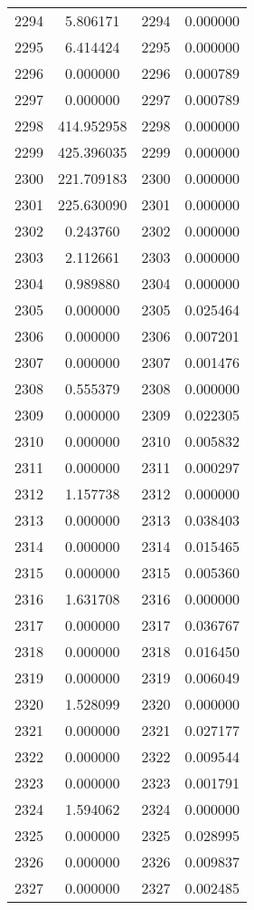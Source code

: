 \documentclass[12pt]{article}
\begin{document}
\begin{longtable}{@{}cccc@{}}
2294 & 5.806171 & 2294 & 0.000000 \\
2295 & 6.414424 & 2295 & 0.000000 \\
2296 & 0.000000 & 2296 & 0.000789 \\
2297 & 0.000000 & 2297 & 0.000789 \\
2298 & 414.952958 & 2298 & 0.000000 \\
2299 & 425.396035 & 2299 & 0.000000 \\
2300 & 221.709183 & 2300 & 0.000000 \\
2301 & 225.630090 & 2301 & 0.000000 \\
2302 & 0.243760 & 2302 & 0.000000 \\
2303 & 2.112661 & 2303 & 0.000000 \\
2304 & 0.989880 & 2304 & 0.000000 \\
2305 & 0.000000 & 2305 & 0.025464 \\
2306 & 0.000000 & 2306 & 0.007201 \\
2307 & 0.000000 & 2307 & 0.001476 \\
2308 & 0.555379 & 2308 & 0.000000 \\
2309 & 0.000000 & 2309 & 0.022305 \\
2310 & 0.000000 & 2310 & 0.005832 \\
2311 & 0.000000 & 2311 & 0.000297 \\
2312 & 1.157738 & 2312 & 0.000000 \\
2313 & 0.000000 & 2313 & 0.038403 \\
2314 & 0.000000 & 2314 & 0.015465 \\
2315 & 0.000000 & 2315 & 0.005360 \\
2316 & 1.631708 & 2316 & 0.000000 \\
2317 & 0.000000 & 2317 & 0.036767 \\
2318 & 0.000000 & 2318 & 0.016450 \\
2319 & 0.000000 & 2319 & 0.006049 \\
2320 & 1.528099 & 2320 & 0.000000 \\
2321 & 0.000000 & 2321 & 0.027177 \\
2322 & 0.000000 & 2322 & 0.009544 \\
2323 & 0.000000 & 2323 & 0.001791 \\
2324 & 1.594062 & 2324 & 0.000000 \\
2325 & 0.000000 & 2325 & 0.028995 \\
2326 & 0.000000 & 2326 & 0.009837 \\
2327 & 0.000000 & 2327 & 0.002485 \\

\end{longtable}
\end{document}

